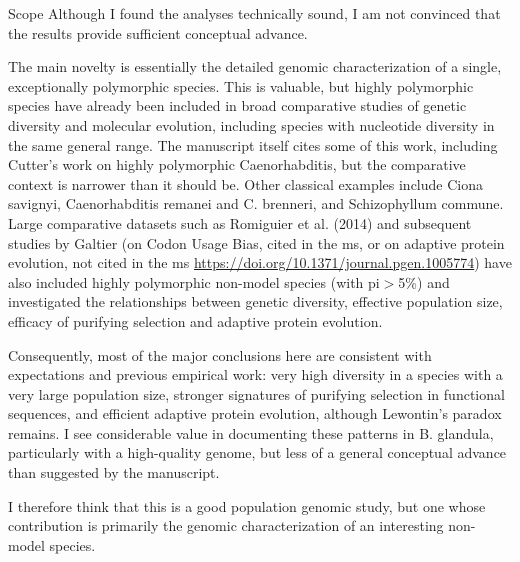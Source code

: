 


\begin{point}{Scope}
Although I found the analyses technically sound, I am not convinced that
the results provide sufficient conceptual advance.

The main novelty is essentially the detailed genomic characterization of
a single, exceptionally polymorphic species. This is valuable, but highly
polymorphic species have already been included in broad comparative
studies of genetic diversity and molecular evolution, including species
with nucleotide diversity in the same general range. The manuscript
itself cites some of this work, including Cutter's work on highly
polymorphic Caenorhabditis, but the comparative context is narrower than
it should be. Other classical examples include Ciona savignyi,
Caenorhabditis remanei and C. brenneri, and Schizophyllum commune. Large
comparative datasets such as Romiguier et al. (2014) and subsequent
studies by Galtier (on Codon Usage Bias, cited in the ms, or on adaptive
protein evolution, not cited in the ms
\url{https://doi.org/10.1371/journal.pgen.1005774}) have also included
highly polymorphic non-model species (with pi$>$5\%) and investigated the
relationships between genetic diversity, effective population size,
efficacy of purifying selection and adaptive protein evolution.

Consequently, most of the major conclusions here are consistent with
expectations and previous empirical work: very high diversity in a
species with a very large population size, stronger signatures of
purifying selection in functional sequences, and efficient adaptive
protein evolution, although Lewontin's paradox remains. I see
considerable value in documenting these patterns in B. glandula,
particularly with a high-quality genome, but less of a general conceptual
advance than suggested by the manuscript.

I therefore think that this is a good population genomic study, but one
whose contribution is primarily the genomic characterization of an
interesting non-model species.
\end{point}


